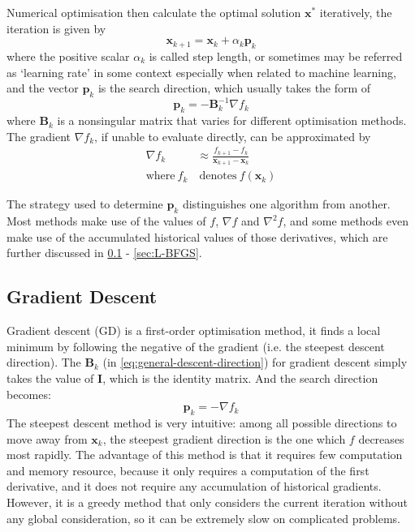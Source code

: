 Numerical optimisation then calculate the optimal solution $\textbf{x}^*$ iteratively, the iteration is given by
\begin{equation}
  \textbf{x}_{k+1} = \textbf{x}_k+\alpha_k \textbf{p}_k
  \label{eq:optimisation_iteration}
\end{equation}
where the positive scalar $\alpha_k$ is called step length, or sometimes may be referred as `learning rate' in some context especially when related to machine learning, and the vector $\textbf{p}_k$ is the search direction, which usually takes the form of
\begin{equation}
  \textbf{p}_k = -\textbf{B}_k^{-1} \nabla f_{k} \label{eq:general-descent-direction}
\end{equation}
where $\textbf{B}_k$ is a nonsingular matrix that varies for different optimisation methods. The gradient $\nabla f_k$, if unable to evaluate directly, can be approximated by
\begin{align}
  \nabla f_k         & \approx \frac{f_{k+1}-f_{k}}{\textbf{x}_{k+1}-\textbf{x}_{k}} \nonumber \\
  \text{where}\  f_k & \ \text{denotes}\  f(\textbf{x}_k)
\end{align}

The strategy used to determine $\textbf{p}_k$ distinguishes one algorithm from another. Most methods make use of the values of $f$, $\nabla f$ and $\nabla^2 f$, and some methods even make use of the accumulated historical values of those derivatives, which are further discussed in \cref{sec:GD} - \cref{sec:L-BFGS}.

\subsection{Gradient Descent}\label{sec:GD}
Gradient descent (GD) is a first-order optimisation method, it finds a local minimum by following the negative of the gradient (i.e. the steepest descent direction). The $\textbf{B}_k$ (in \cref{eq:general-descent-direction}) for gradient descent simply takes the value of $\textbf{I}$, which is the identity matrix. And the search direction becomes:
\begin{equation}
  \textbf{p}_k = -\nabla f_k
\end{equation}
The steepest descent method is very intuitive: among all possible directions to move away from $\textbf{x}_{k}$, the steepest gradient direction is the one which $f$ decreases most rapidly. The advantage of this method is that it requires few computation and memory resource, because it only requires a computation of the first derivative, and it does not require any accumulation of historical gradients. However, it is a greedy method that only considers the current iteration without any global consideration, so it can be extremely slow on complicated problems. \cite{Nocedal2006}

